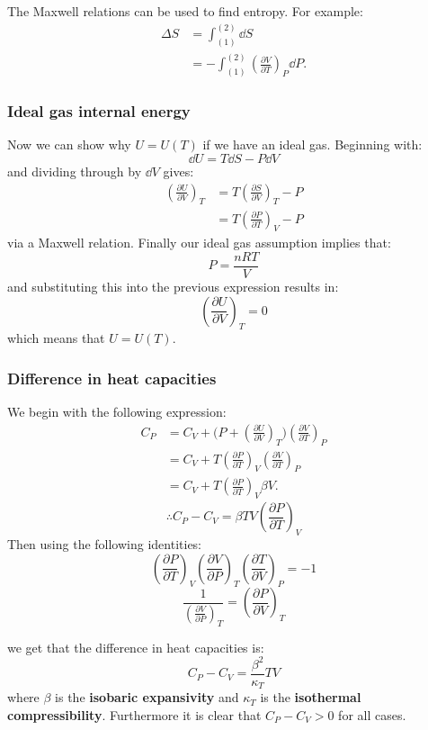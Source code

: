 \documentclass{article}
\begin{document}
The Maxwell relations can be used to find entropy. For example:
\begin{align*}
    \Delta S
    &=\int_{(1)}^{(2)}\dd S\\
    &=-\int_{(1)}^{(2)}\left(\frac{\partial V}{\partial T}\right)_P \dd P.
\end{align*}

\subsubsection{Ideal gas internal energy}
Now we can show why $U=U(T)$ if we have an ideal gas. Beginning with:
$$\dd U=T\dd S-P\dd V$$
and dividing through by $\dd V$ gives:
\begin{align*}
    \left(\frac{\partial U}{\partial V}\right)_T
    &=T\left(\frac{\partial S}{\partial V}\right)_T-P \\
    &=T\left(\frac{\partial P}{\partial T}\right)_V-P
\end{align*}
via a Maxwell relation.
Finally our ideal gas assumption implies that:
$$P=\frac{nRT}{V}$$
and substituting this into the previous expression results in:
$$\left(\frac{\partial U}{\partial V}\right)_T=0$$
which means that $U=U(T)$.

\newpage

\subsubsection{Difference in heat capacities}
We begin with the following expression:
\begin{align*}
    C_P
    &=C_V+\bigl(P+
    \left(\frac{\partial U}{\partial V}\right)_T\bigl)
    \left(\frac{\partial V}{\partial T}\right)_P \\
    &=C_V+T\left(\frac{\partial P}{\partial T}\right)_V
    \left(\frac{\partial V}{\partial T}\right)_P \\
    &=C_V+T\left(\frac{\partial P}{\partial T}\right)_V
    \beta V.
\end{align*}
$$\therefore C_P-C_V=\beta TV
\left(\frac{\partial P}{\partial T}\right)_V$$
Then using the following identities:
$$\left(\frac{\partial P}{\partial T}\right)_V
\left(\frac{\partial V}{\partial P}\right)_T
\left(\frac{\partial T}{\partial V}\right)_P=-1$$
$$\frac{1}{\left(\frac{\partial V}{\partial P}\right)_T}
=\left(\frac{\partial P}{\partial V}\right)_T$$

we get that the difference in heat capacities is:
$$C_P-C_V=\frac{\beta^2}{\kappa_T} TV$$
where $\beta$ is the \textbf{isobaric expansivity}
and $\kappa_T$ is the \textbf{isothermal compressibility}.
Furthermore it is clear that $C_P-C_V>0$ for all cases.
\end{document}
